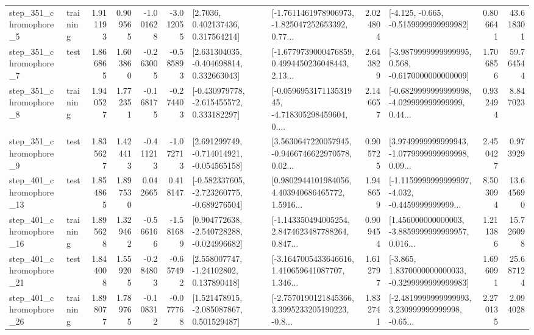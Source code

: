 \begin{tabular}{llrrrrllrlrr}
   step\_351\_chromophore\_5 &  training &      1.911193 &    0.909565 &     -1.001628 & -3.012055 &          [2.7036, 0.402137436, 0.317564214] &  [-1.7611461978906973, -1.825047252653392, 0.77... &       2.024804 &              [-4.125, -0.665, -0.5159999999999982] &            0.806641 &         43.618301 \\
   step\_351\_chromophore\_7 &      test &      1.866865 &    1.603860 &     -0.263005 & -0.585893 &    [2.631304035, -0.404698814, 0.332663043] &  [-1.6779739000476859, 0.4994450236048443, 2.13... &       2.643829 &  [-3.9879999999999995, 0.568, -0.6170000000000009] &            1.706856 &         59.764544 \\
   step\_351\_chromophore\_8 &  training &      1.940527 &    1.772351 &     -0.168175 & -0.274403 &   [-0.430979778, -2.615455572, 0.333182297] &  [-0.059695317113531945, -4.718305298459604, 0.... &       2.146657 &  [-0.6829999999999998, -4.029999999999999, 0.44... &            0.932494 &          8.847023 \\
   step\_351\_chromophore\_9 &      test &      1.835627 &    1.424413 &     -0.411213 & -1.072713 &   [2.691299749, -0.714014921, -0.054565158] &  [3.5630647220057945, -0.9466746622970578, 0.02... &       0.905725 &  [3.9749999999999943, -1.0779999999999998, 0.09... &            2.450427 &          0.973929 \\
  step\_401\_chromophore\_13 &      test &      1.854865 &    1.897530 &      0.042665 &  0.418147 &  [-0.582337605, -2.723260775, -0.689276504] &  [0.9802944101984056, 4.403940686465772, 1.5916... &       1.948659 &  [-1.1159999999999997, -4.032, -0.4459999999999... &            8.503094 &         13.645690 \\
  step\_401\_chromophore\_16 &  training &      1.895628 &    1.329462 &     -0.566166 & -1.581689 &   [0.904772638, -2.540728288, -0.024996682] &  [-1.143350494005254, 2.8474623487788264, 0.847... &       0.909454 &  [1.456000000000003, -3.8859999999999957, 0.016... &            1.211386 &         15.726098 \\
  step\_401\_chromophore\_21 &      test &      1.844008 &    1.559205 &     -0.284803 & -0.657492 &     [2.558007747, -1.24102802, 0.137890418] &  [-3.1647005433646616, 1.410659641087707, 1.346... &       1.612797 &  [-3.865, 1.8370000000000033, -0.3299999999999983] &            1.696091 &         25.687124 \\
  step\_401\_chromophore\_26 &  training &      1.898077 &    1.789765 &     -0.108312 & -0.077768 &    [1.521478915, -2.085087867, 0.501529487] &  [-2.7570190121845366, 3.3995233205190223, -0.8... &       1.832741 &  [-2.4819999999999993, 3.230999999999998, -0.65... &            2.270135 &          2.094028 \\

\end{tabular}
